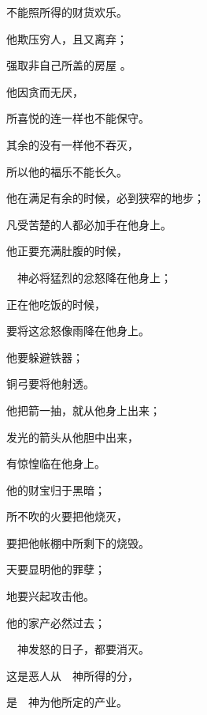 {\par }{\Q 不能照所得的财货欢乐。
\par }{\Q {}他欺压穷人，且又离弃；
\par }{\Q 强取非自己所盖的房屋
。
\par }{\Q {}他因贪而无厌，
\par }{\Q 所喜悦的连一样也不能保守。
\par }{\Q {}其余的没有一样他不吞灭，
\par }{\Q 所以他的福乐不能长久。
\par }{\Q {}他在满足有余的时候，必到狭窄的地步；
\par }{\Q 凡受苦楚的人都必加手在他身上。
\par }{\Q {}他正要充满肚腹的时候，
\par }{\Q 　神必将猛烈的忿怒降在他身上；
\par }{\Q 正在他吃饭的时候，
\par }{\Q 要将这忿怒像雨降在他身上。
\par }{\Q {}他要躲避铁器；
\par }{\Q 铜弓{}要将他射透。
\par }{\Q {}他把箭一抽，就从他身上出来；
\par }{\Q 发光的箭头从他胆中出来，
\par }{\Q 有惊惶临在他身上。
\par }{\Q {}他的财宝归于黑暗；
\par }{所不吹的火要把他烧灭，
\par }{\Q 要把他帐棚中所剩下的烧毁。
\par }{\Q {}天要显明他的罪孽；
\par }{\Q 地要兴起攻击他。
\par }{\Q {}他的家产必然过去；
\par }{\Q 　神发怒的日子，{}都要消灭。
\par }{\Q {}这是恶人从　神所得的分，
\par }{\Q 是　神为他所定的产业。

}
